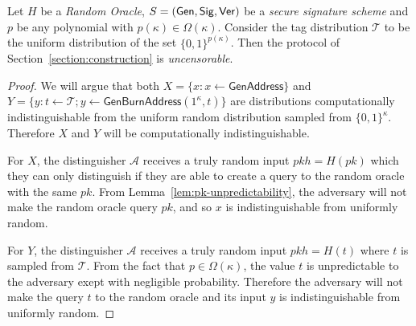 \begin{theorem}
  Let $H$ be a \emph{Random Oracle}, $S = (\mathsf{Gen}, \mathsf{Sig}, \mathsf{Ver})$ be a \emph{secure signature scheme} and $p$ be any polynomial with $p(\kappa) \in \Omega(\kappa)$. Consider the tag distribution $\mathcal{T}$ to be the uniform distribution of the set $\{0, 1\}^{p(\kappa)}$.
  Then the protocol of Section~\ref{section:construction} is \emph{uncensorable}.
\end{theorem}
\begin{proof}
  We will argue that both
  $X = \{x: x \gets \textsf{GenAddress}\}$ and
  $Y = \{y: t \gets \mathcal{T}; y \gets \textsf{GenBurnAddress}(1^\kappa, t)\}$ are distributions computationally indistinguishable from the uniform random distribution sampled from $\{0, 1\}^\kappa$. Therefore $X$ and $Y$ will be computationally indistinguishable.

  For $X$, the distinguisher $\mathcal{A}$ receives a truly random input $pkh = H(pk)$ which they can only distinguish if they are able to create a query to the random oracle with the same $pk$. From Lemma~\ref{lem:pk-unpredictability}, the adversary will not make the random oracle query $pk$, and so $x$ is indistinguishable from uniformly random.

  For $Y$, the distinguisher $\mathcal{A}$ receives a truly random input $pkh = H(t)$ where $t$ is sampled from $\mathcal{T}$. From the fact that $p \in \Omega(\kappa)$, the value $t$ is unpredictable to the adversary exept with negligible probability. Therefore the adversary will not make the query $t$ to the random oracle and its input $y$ is indistinguishable from uniformly random.
\end{proof}
